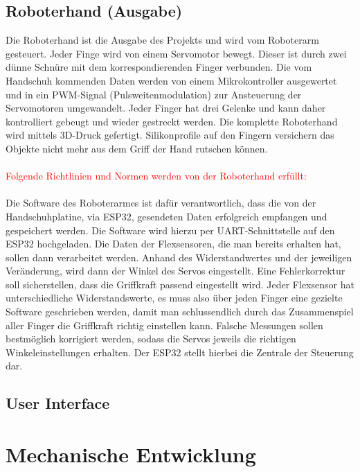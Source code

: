 \documentclass[11pt]{article}
\begin{document}
\subsection{Roboterhand (Ausgabe)}
Die Roboterhand ist die Ausgabe des Projekts und wird vom Roboterarm gesteuert. Jeder Finge wird von einem Servomotor 
bewegt. Dieser ist durch zwei dünne Schnüre mit dem korrespondierenden Finger verbunden. Die vom Handschuh kommenden 
Daten werden von einem Mikrokontroller ausgewertet und in ein PWM-Signal (Pulsweitenmodulation) zur Ansteuerung der 
Servomotoren umgewandelt. Jeder Finger hat drei Gelenke und kann daher kontrolliert gebeugt und wieder gestreckt werden. 
Die komplette Roboterhand wird mittels 3D-Druck gefertigt. Silikonprofile auf den Fingern versichern das Objekte nicht 
mehr aus dem Griff der Hand rutschen können.\\
\\
\textcolor{red}{Folgende Richtlinien und Normen werden von der Roboterhand erfüllt:}\\
\\
Die Software des Roboterarmes ist dafür verantwortlich, dass die von der Handschuhplatine, via ESP32, gesendeten Daten 
erfolgreich empfangen und gespeichert werden. Die Software wird hierzu per UART-Schnittstelle auf den ESP32 hochgeladen. 
Die Daten der Flexsensoren, die man bereits erhalten hat, sollen dann verarbeitet werden. Anhand des Widerstandwertes und 
der jeweiligen Veränderung, wird dann der Winkel des Servos eingestellt. Eine Fehlerkorrektur soll sicherstellen, dass die 
Griffkraft passend eingestellt wird. Jeder Flexsensor hat unterschiedliche Widerstandswerte, es muss also über jeden Finger 
eine gezielte Software geschrieben werden, damit man schlussendlich durch das Zusammenspiel aller Finger die Griffkraft 
richtig einstellen kann. Falsche Messungen sollen bestmöglich korrigiert werden, sodass die Servos jeweils die richtigen 
Winkeleinstellungen erhalten. Der ESP32 stellt hierbei die Zentrale der Steuerung dar.

\subsection{User Interface}


\section{Mechanische Entwicklung}
\end{document}
